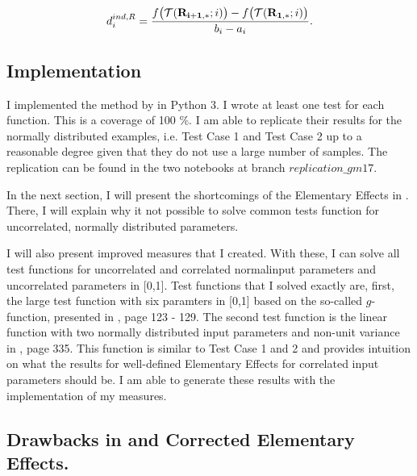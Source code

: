 \documentclass[a4paper,12pt]{article}
\begin{document}
\begin{align}
d_i^{ind, R} = \frac{f\big(\mathcal{T}(\bold{R_{i+1,*}}; i)\big) - f\big(\mathcal{T}(\bold{R_{1,*}}; i)\big)}{b_i - a_i}.
\end{align}

\subsection{Implementation}

I implemented the method by \cite{ge2017extending} in Python 3. I wrote at least one test for each function. This is a coverage of 100 \%. I am able to replicate their results for the normally distributed examples, i.e. Test Case 1 and Test Case 2 up to a reasonable degree given that they do not use a large number of samples.
The replication can be found in the two notebooks at branch $\textit{replication\_gm17}$.

In the next section, I will present the shortcomings of the Elementary Effects in \cite{ge2017extending}. There, I will explain why it not possible to solve common tests function for uncorrelated, normally distributed parameters.

I will also present improved measures that I created. With these, I can solve all test functions for uncorrelated and correlated normalinput parameters and uncorrelated parameters in [0,1]. Test functions that I solved exactly are, first, the large test function with six paramters in [0,1] based on the so-called $g$-function, presented in \cite{Saltelli.2008}, page 123 - 129. The second test function is the linear function with two normally distributed input parameters and non-unit variance in \cite{Smith.2014}, page 335. This function is similar to Test Case 1 and 2 and provides intuition on what the results for well-defined Elementary Effects for correlated input parameters should be. I am able to generate these results with the implementation of my measures.

\subsection{Drawbacks in \cite{ge2017extending} and Corrected Elementary Effects.}
\end{document}
